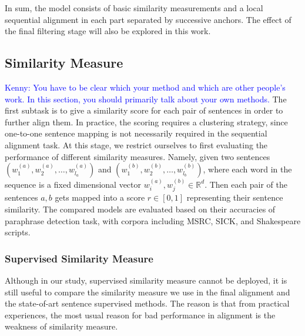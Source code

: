 \documentclass[runningheads]{llncs}
\newcommand{\KZ}[1]{\textcolor{blue}{Kenny: #1}}
\begin{document}
In sum, the model consists of basic similarity measurements and a local sequential alignment in each part separated by successive anchors. The effect of the final filtering stage will also be explored in this work.


\subsection{Similarity Measure}

\KZ{You have to be clear which your method and which are other people's work.
In this section, you should primarily talk about your own methods.}
The first subtask is to give a similarity score for each pair of sentences in order to further align them. In practice, the scoring requires a clustering strategy, since one-to-one sentence mapping is not necessarily required in the sequential alignment task. At this stage, we restrict ourselves to first evaluating the performance of different similarity measures. Namely, given two sentences $(w_1^{(a)}, w_2^{(a)}, \ldots, w_{l_a}^{(a)})$ and $(w_1^{(b)}, w_2^{(b)}, \ldots, w_{l_b}^{(b)})$, where each word in the sequence is a fixed dimensional vector $w_i^{(a)}, w_j^{(b)}\in \mathbb{R}^d$. Then each pair of the sentences $a, b$ gets mapped into a score $r\in [0, 1]$ representing their sentence similarity. The compared models are evaluated based on their accuracies of paraphrase detection task, with corpora including MSRC, SICK, and Shakespeare scripts.

\subsubsection{Supervised Similarity Measure}

Although in our study, supervised similarity measure cannot be deployed, it is still useful to compare the similarity measure we use in the final alignment and the state-of-art sentence supervised methods. The reason is that from practical experiences, the most usual reason for bad performance in alignment is the weakness of similarity measure.
\end{document}
